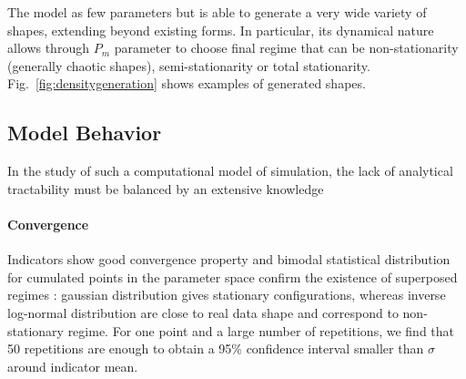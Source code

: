 \documentclass[10pt,letterpaper]{article}
\begin{document}
The model as few parameters but is able to generate a very wide variety of shapes, extending beyond existing forms. In particular, its dynamical nature allows through $P_m$ parameter to choose final regime that can be non-stationarity (generally chaotic shapes), semi-stationarity or total stationarity. Fig.~\ref{fig:densitygeneration} shows examples of generated shapes.








\subsection{Model Behavior}

In the study of such a computational model of simulation, the lack of analytical tractability must be balanced by an extensive knowledge 

\paragraph{Convergence}




Indicators show good convergence property and bimodal statistical distribution for cumulated points in the parameter space confirm the existence of superposed regimes : gaussian distribution gives stationary configurations, whereas inverse log-normal distribution are close to real data shape and correspond to non-stationary regime. For one point and a large number of repetitions, we find that 50 repetitions are enough to obtain a 95\% confidence interval smaller than $\sigma$ around indicator mean. 
\end{document}
